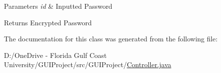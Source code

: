 \begin{DoxyParams}{Parameters}
{\em id} & Inputted Password \\
\hline
\end{DoxyParams}
\begin{DoxyReturn}{Returns}
Encrypted Password 
\end{DoxyReturn}


The documentation for this class was generated from the following file\+:\begin{DoxyCompactItemize}
\item 
D\+:/\+One\+Drive -\/ Florida Gulf Coast University/\+G\+U\+I\+Project/src/\+G\+U\+I\+Project/\mbox{\hyperlink{_controller_8java}{Controller.\+java}}\end{DoxyCompactItemize}
